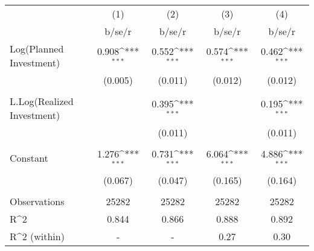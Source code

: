 {
\def\sym#1{\ifmmode^{#1}\else\(^{#1}\)\fi}
\begin{tabular}{l*{4}{c}}
\toprule
                    &\multicolumn{1}{c}{(1)}         &\multicolumn{1}{c}{(2)}         &\multicolumn{1}{c}{(3)}         &\multicolumn{1}{c}{(4)}         \\
                    &      b/se/r         &      b/se/r         &      b/se/r         &      b/se/r         \\
\midrule
Log(Planned Investment)&       0.908\sym{***}&       0.552\sym{***}&       0.574\sym{***}&       0.462\sym{***}\\
                    &     (0.005)         &     (0.011)         &     (0.012)         &     (0.012)         \\
                    &                     &                     &                     &                     \\
L.Log(Realized Investment)&                     &       0.395\sym{***}&                     &       0.195\sym{***}\\
                    &                     &     (0.011)         &                     &     (0.011)         \\
                    &                     &                     &                     &                     \\
Constant            &       1.276\sym{***}&       0.731\sym{***}&       6.064\sym{***}&       4.886\sym{***}\\
                    &     (0.067)         &     (0.047)         &     (0.165)         &     (0.164)         \\
                    &                     &                     &                     &                     \\
\midrule
Observations        &       25282         &       25282         &       25282         &       25282         \\
R^2                 &       0.844         &       0.866         &       0.888         &       0.892         \\
R^2 (within)        &           -         &           -         &        0.27         &        0.30         \\
\bottomrule
\end{tabular}
}
